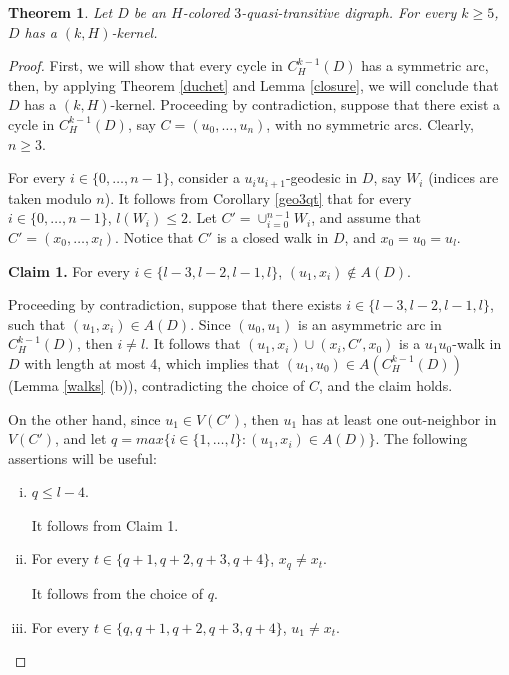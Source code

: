 \documentclass[10pt,a4paper]{article}
\newtheorem{theorem}{Theorem}[section]
\begin{document}
\begin{theorem}
\label{pan3qtr}
Let $D$ be an $H$-colored $3$-quasi-transitive digraph. For every $k \geq 5$, $D$ has a $(k,H)$-kernel.
\end{theorem}
\begin{proof}
First, we will show that every cycle in $C_{H}^{k-1}(D)$ has a symmetric arc, then, by applying Theorem \ref{duchet} and Lemma \ref{closure}, we will conclude that $D$ has a $(k,H)$-kernel. Proceeding by contradiction, suppose that there exist a cycle in  $C_{H}^{k-1}(D)$, say $C=(u_{0}, \ldots , u_{n})$, with no symmetric arcs. Clearly, $n \geq 3$. 

For every $i \in \{0, \ldots , n-1\}$, consider a $u_{i}u_{i+1}$-geodesic in $D$, say $W_{i}$ (indices are taken modulo $n$). It follows from Corollary \ref{geo3qt} that for every $i \in \{ 0, \ldots , n-1\}$, $l(W_{i}) \leq 2$. Let $C'=\cup_{i=0}^{n-1}W_{i}$, and assume that $C' =(x_{0}, \ldots , x_{l})$. Notice that $C'$ is a closed walk in $D$, and $x_{0}=u_{0}=u_{l}$.

\begin{description}
\item \textbf{Claim 1.} For every $i \in \{ l-3,l-2,l-1, l\}$, $(u_{1}, x_{i}) \notin A(D)$.

Proceeding by contradiction, suppose that there exists  $i \in \{ l-3, l-2,l-1,l \}$, such that $(u_{1}, x_{i}) \in A(D)$. Since $(u_{0}, u_{1})$ is an asymmetric arc in $C^{k-1}_{H}(D)$, then $i \neq l$.  It follows that $(u_{1},x_{i}) \cup (x_{i}, C', x_{0})$ is a $u_{1}u_{0}$-walk in $D$ with length at most 4, which implies that $(u_{1}, u_{0}) \in A(C_{H}^{k-1}(D))$ (Lemma \ref{walks} (b)), contradicting the choice of $C$, and the claim holds.
\end{description}

On the other hand, since $u_{1} \in V(C')$, then $u_{1}$ has at least one out-neighbor in $V(C')$, and let $q=max \{ i \in \{ 1, \ldots , l \} : (u_{1}, x_{i}) \in A(D)\}$. The following assertions will be useful:
\begin{enumerate}[(i)]
\item $q \leq l -4$.

It follows from Claim 1.

\item For every $t \in \{q+1, q+2, q+3, q+4\}$, $x_{q} \neq x_{t}$.

It follows from the choice of $q$.

\item For every $t \in \{ q, q+1, q+2, q+3, q+4\}$, $u_{1} \neq x_{t}$.


\end{enumerate}
\end{proof}
\end{document}
